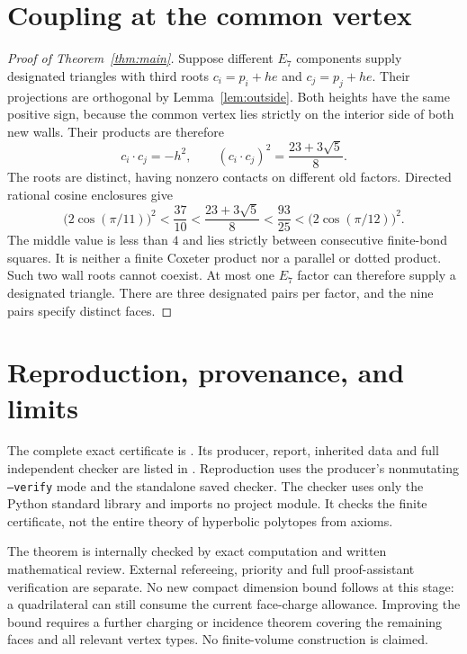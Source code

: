 \documentclass[11pt]{article}
\begin{document}
\section{Coupling at the common vertex}
\begin{proof}[Proof of Theorem~\ref{thm:main}]
Suppose different $E_7$ components supply designated triangles with
third roots $c_i=p_i+h e$ and $c_j=p_j+h e$. Their projections are
orthogonal by Lemma~\ref{lem:outside}. Both heights have the same positive
sign, because the common vertex lies strictly on the interior side of
both new walls. Their products are therefore
\[
c_i\cdot c_j=-h^2,\qquad
(c_i\cdot c_j)^2=\frac{23+3\sqrt5}{8}.
\]
The roots are distinct, having nonzero contacts on different old factors.
Directed rational cosine enclosures give
\[
\bigl(2\cos(\pi/11)\bigr)^2
<\frac{37}{10}<\frac{23+3\sqrt5}{8}
<\frac{93}{25}<\bigl(2\cos(\pi/12)\bigr)^2.
\]
The middle value is less than $4$ and lies strictly between consecutive
finite-bond squares. It is neither a finite Coxeter product nor a parallel
or dotted product. Such two wall roots cannot coexist. At most one $E_7$
factor can therefore supply a designated triangle. There are three
designated pairs per factor, and the nine pairs specify distinct faces.
\end{proof}

\section{Reproduction, provenance, and limits}
The complete exact certificate is
.
Its producer, report, inherited data and full independent checker are
listed in . Reproduction
uses the producer's nonmutating \texttt{--verify} mode and the standalone
saved checker. The checker uses only the Python standard library and
imports no project module. It checks the finite certificate, not the
entire theory of hyperbolic polytopes from axioms.

The theorem is internally checked by exact computation and written
mathematical review. External refereeing, priority and full
proof-assistant verification are separate. No new compact dimension
bound follows at this stage: a quadrilateral can still consume the
current face-charge allowance. Improving the bound requires a further
charging or incidence theorem covering the remaining faces and all
relevant vertex types. No finite-volume construction is claimed.
\end{document}
